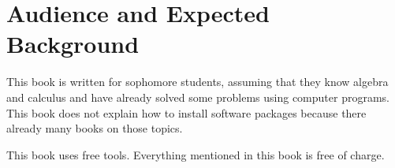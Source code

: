 \section*{Audience and Expected Background}

This book is written for sophomore students, assuming that they know
algebra and calculus and have already solved some problems using
computer programs. This book does not explain how to install software
packages because there already many books on those topics.

This book uses free tools. Everything mentioned in this book is free
of charge.






